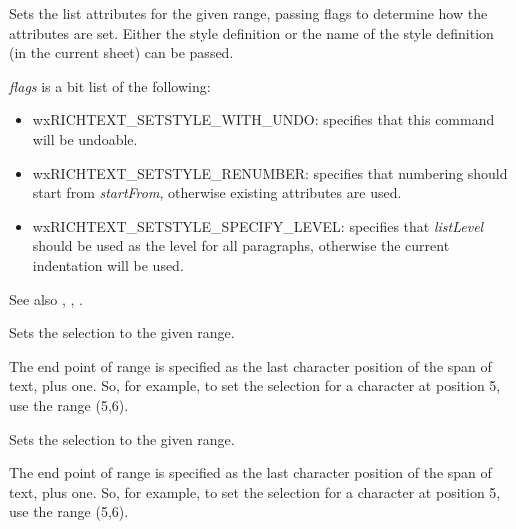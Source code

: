 Sets the list attributes for the given range, passing flags to determine how the attributes are set.
Either the style definition or the name of the style definition (in the current sheet) can be passed.

{\it flags} is a bit list of the following:

\begin{itemize}\itemsep=0pt
\item wxRICHTEXT\_SETSTYLE\_WITH\_UNDO: specifies that this command will be undoable.
\item wxRICHTEXT\_SETSTYLE\_RENUMBER: specifies that numbering should start from {\it startFrom}, otherwise existing attributes are used.
\item wxRICHTEXT\_SETSTYLE\_SPECIFY\_LEVEL: specifies that {\it listLevel} should be used as the level for all paragraphs, otherwise the current indentation will be used.
\end{itemize}

See also , , .

\label{wxrichtextctrlsetselection}


Sets the selection to the given range.

The end point of range is specified as the last character position of the span of text, plus one.
So, for example, to set the selection for a character at position 5, use the range (5,6).

\label{wxrichtextctrlsetselectionrange}


Sets the selection to the given range.

The end point of range is specified as the last character position of the span of text, plus one.
So, for example, to set the selection for a character at position 5, use the range (5,6).

\label{wxrichtextctrlsetstyle}



